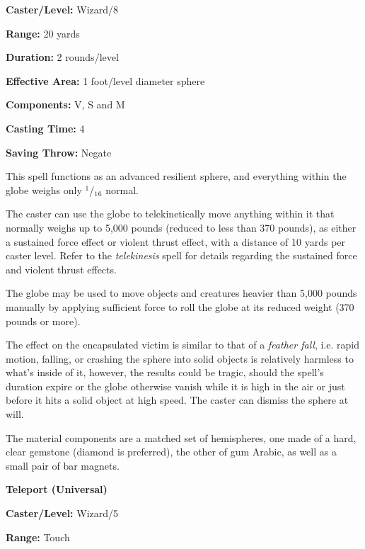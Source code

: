 \begin{multicols}{2}
\begin{minipage}{\columnwidth}
\noindent \textbf{Caster/Level:} Wizard/8

\noindent \textbf{Range:} 20 yards

\noindent \textbf{Duration:} 2 rounds/level

\noindent \textbf{Effective Area:} 1 foot/level diameter sphere 

\noindent \textbf{Components:} V, S and M

\noindent \textbf{Casting Time:} 4

\noindent \textbf{Saving Throw:} Negate

\end{minipage}

This spell functions as an advanced resilient sphere, and everything within the globe weighs only $^1$/$_1$$_6$ normal.  

The caster can use the globe to telekinetically move anything within it that normally weighs up to 5,000 pounds (reduced to less than 370 pounds), as either a sustained force effect or violent thrust effect, with a distance of 10 yards per caster level.  Refer to the \textit{telekinesis} spell for details regarding the sustained force and violent thrust effects.

The globe may be used to move objects and creatures heavier than 5,000 pounds manually by applying sufficient force to roll the globe at its reduced weight (370 pounds or more).  

The effect on the encapsulated victim is similar to that of a \textit{feather fall}, i.e. rapid motion, falling, or crashing the sphere into solid objects is relatively harmless to what's inside of it, however, the results could be tragic, should the spell's duration expire or the globe otherwise vanish while it is high in the air or just before it hits a solid object at high speed.  The caster can dismiss the sphere at will.

The material components are a matched set of hemispheres, one made of a hard, clear gemstone (diamond is preferred), the other of gum Arabic, as well as a small pair of bar magnets.

\vspace{1em}

\noindent
\begin{minipage}{\columnwidth}

\noindent \textbf{Teleport (Universal)}

\noindent \textbf{Caster/Level:} Wizard/5

\noindent \textbf{Range:} Touch


\end{minipage}
\end{multicols}
